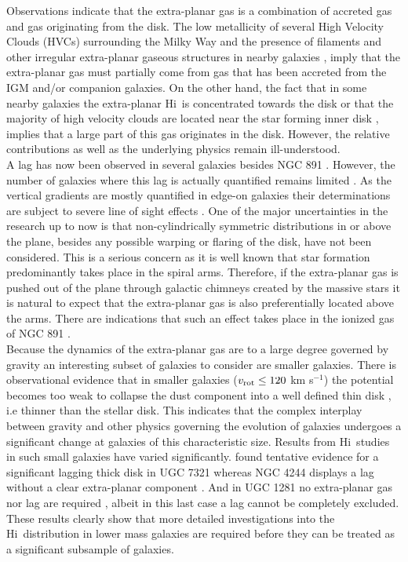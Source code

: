 \documentclass[useAMS,usenatbib]{mn2e}
\newcommand\HI{H{\sc i}}
\begin{document}
\indent Observations indicate that the extra-planar gas is a combination of accreted gas and gas originating from the disk. The low metallicity of several High Velocity Clouds (HVCs) surrounding the Milky Way \citep{2004ASSL..312..195V} and the presence of filaments and other irregular extra-planar gaseous structures in nearby galaxies \citep{Sancisi2008},  imply that the extra-planar gas must partially come from gas that has been accreted from the IGM and/or companion galaxies.  On the other hand, the fact that  in some nearby galaxies the extra-planar \HI\ is concentrated towards the disk \citep{Oosterloo2007}  or that the majority of high velocity clouds are located near the star forming inner disk \citep{2005ASPC..331..247B}, implies that a large part of this gas originates in the disk. However, the relative contributions as well as the underlying physics remain ill-understood.\\
\indent  A lag has now been observed in several  galaxies besides NGC 891  \citep{2007ApJ...663..933H,Zschaechner2012}. However, the number of galaxies where this lag is actually quantified remains limited \citep[see][for a recent overview]{Zschaechner2012}. As the vertical gradients are mostly quantified in edge-on galaxies their determinations are subject to severe line of sight effects \citep{1979A&A....74...73S}. One of the major uncertainties in the research up to now is that non-cylindrically symmetric distributions in or above the plane, besides any possible warping or flaring of the disk, have not been considered. This is a serious concern as it is well known that star formation predominantly takes place  in the spiral arms. Therefore, if the extra-planar gas is pushed out of the plane through galactic chimneys created by  the massive stars it is natural to expect that the extra-planar gas is also preferentially located above the arms. There are indications that such an effect takes place in the ionized gas of  NGC 891 \citep{Kamphuis2007b}. \\
\indent  Because the dynamics of the extra-planar gas  are to a large degree governed by gravity an interesting subset of galaxies to consider are smaller galaxies. There is observational evidence that in smaller galaxies ($v_{{\rm rot}} \leq 120$ km s$^{-1}$) the potential becomes too weak to collapse the dust component into a well defined thin disk \citep{2004ApJ...608..189D}, i.e thinner than the stellar disk. This indicates that the complex interplay between gravity and other physics governing the evolution of galaxies undergoes a significant change at galaxies of this characteristic size. Results from \HI\  studies in such small galaxies have varied significantly.  \cite{2003ApJ...593..721M} found tentative evidence for a significant lagging thick disk in UGC 7321 whereas NGC 4244 displays a lag without a clear extra-planar component \citep{Zschaechner2011}. And in UGC 1281   no extra-planar gas nor lag are required \citep{Kamphuis2011}, albeit in this last  case a lag cannot be completely excluded. These results clearly show that more detailed investigations into the \HI\ distribution in lower mass galaxies are required before they can be treated as a significant subsample of galaxies.\\
\end{document}
